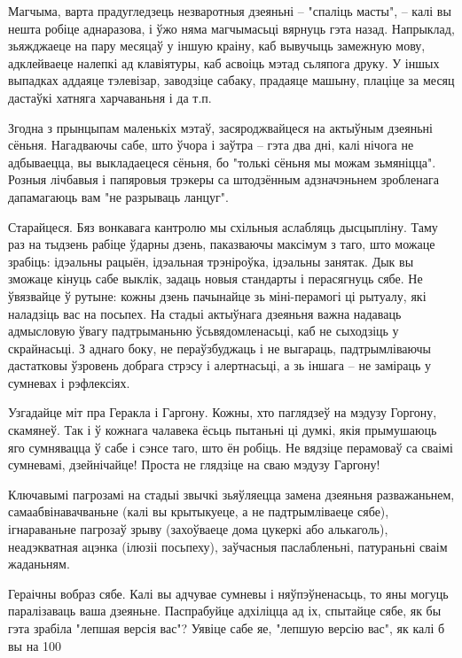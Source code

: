 Магчыма, варта прадугледзець незваротныя дзеяньні – "спаліць масты", – калі вы нешта робіце аднаразова, і ўжо няма магчымасьці вярнуць гэта назад. Напрыклад, зьяжджаеце на пару месяцаў у іншую краіну, каб вывучыць замежную мову, адклейваеце налепкі ад клавіятуры, каб асвоіць мэтад сьляпога друку. У іншых выпадках аддаяце тэлевізар, заводзіце сабаку, прадаяце машыну, плаціце за месяц дастаўкі хатняга харчаваньня і да т.п.

Згодна з прынцыпам маленькіх мэтаў, засяроджвайцеся на актыўным дзеяньні сёньня. Нагадваючы сабе, што ўчора і заўтра – гэта два дні, калі нічога не адбываецца, вы выкладаецеся сёньня, бо "толькі сёньня мы можам зьмяніцца". Розныя лічбавыя і папяровыя трэкеры са штодзённым адзначэньнем зробленага дапамагаюць вам "не разрываць ланцуг".

Старайцеся. Бяз вонкавага кантролю мы схільныя аслабляць дысцыпліну. Таму раз на тыдзень рабіце ўдарны дзень, паказваючы максімум з таго, што можаце зрабіць: ідэальны рацыён, ідэальная трэніроўка, ідэальны занятак. Дык вы зможаце кінуць сабе выклік, задаць новыя стандарты і перасягнуць сябе. Не ўвязвайце ў рутыне: кожны дзень пачынайце зь міні-перамогі ці рытуалу, які наладзіць вас на посьпех. На стадыі актыўнага дзеяньня важна надаваць адмысловую ўвагу падтрыманьню ўсьвядомленасьці, каб не сыходзіць у скрайнасьці. З аднаго боку, не пераўзбуджаць і не выгараць, падтрымліваючы дастатковы ўзровень добрага стрэсу і алертнасьці, а зь іншага – не заміраць у сумневах і рэфлексіях.

Узгадайце міт пра Геракла і Гаргону. Кожны, хто паглядзеў на мэдузу Горгону, скамянеў. Так і ў кожнага чалавека ёсьць пытаньні ці думкі, якія прымушаюць яго сумнявацца ў сабе і сэнсе таго, што ён робіць. Не вядзіце перамоваў са сваімі сумневамі, дзейнічайце! Проста не глядзіце на сваю мэдузу Гаргону!

Ключавымі пагрозамі на стадыі звычкі зьяўляецца замена дзеяньня разважаньнем, самаабвінавачваньне (калі вы крытыкуеце, а не падтрымліваеце сябе), ігнараваньне пагрозаў зрыву (захоўваеце дома цукеркі або алькаголь), неадэкватная ацэнка (ілюзіі посьпеху), заўчасныя паслабленьні, патураньні сваім жаданьням.

Гераічны вобраз сябе. Калі вы адчувае сумневы і няўпэўненасьць, то яны могуць паралізаваць ваша дзеяньне. Паспрабуйце адхіліцца ад іх, спытайце сябе, як бы гэта зрабіла "лепшая версія вас"? Уявіце сабе яе, "лепшую версію вас", як калі б вы на 100%

